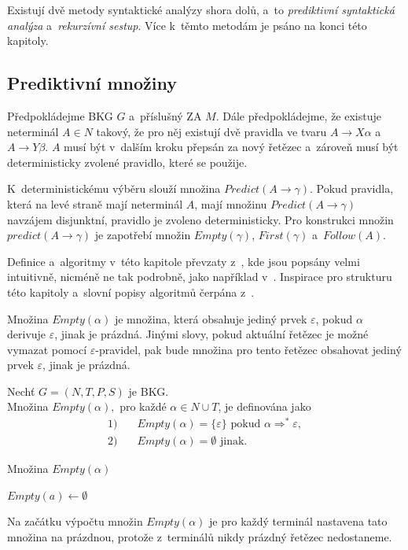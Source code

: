 Existují dvě metody syntaktické analýzy shora dolů, a~to \emph{prediktivní syntaktická analýza} a~\emph{rekurzívní sestup}.
Více k~těmto metodám je psáno na konci této kapitoly.

\subsection*{Prediktivní množiny}
Předpokládejme BKG $G$ a~příslušný ZA $M$.
Dále předpokládejme, že existuje neterminál $A \in N$ takový, že pro něj existují dvě pravidla ve tvaru $A \rightarrow X\alpha$ a~$A \rightarrow Y\beta$.
$A$ musí být v~dalším kroku přepsán za nový řetězec a~zároveň musí být deterministicky zvolené pravidlo, které se použije.

K~deterministickému výběru slouží množina $Predict(A \rightarrow \gamma)$.
Pokud pravidla, která na levé straně mají neterminál $A$, mají množinu $Predict(A \rightarrow \gamma)$ navzájem disjunktní, pravidlo je zvoleno deterministicky.
Pro konstrukci množin $predict(A \rightarrow \gamma)$ je zapotřebí množin $Empty(\gamma)$, $First(\gamma)$ a~$Follow(A)$. 

Definice a~algoritmy v~této kapitole převzaty z~\cite{meduna2017sa-shora-dolu,kunda2022}, kde jsou popsány velmi intuitivně, nicméně ne tak podrobně, jako například v~\cite{medunaElementsOfCompDesign}.
Inspirace pro strukturu této kapitoly a~slovní popisy algoritmů čerpána z~\cite{kunda2022}.

Množina $Empty(\alpha)$ je množina, která obsahuje jediný prvek $\varepsilon$, pokud $\alpha$ derivuje $\varepsilon$, jinak je prázdná.
Jinými slovy, pokud aktuální řetězec je možné vymazat pomocí $\varepsilon$-pravidel, pak bude množina pro tento řetězec obsahovat jediný prvek $\varepsilon$, jinak je prázdná.
\begin{definition}\label{def_mnozina_empty}
    Nechť $G = (N, T, P, S)$ je BKG. \\
    Množina $Empty(\alpha),$ pro každé $\alpha \in N \cup T$, je definována jako
    \begin{align*}
        1) & \quad Empty(\alpha) = \{\varepsilon\} \text{ pokud } \alpha \Rightarrow^* \varepsilon, \\
        2) & \quad Empty(\alpha) = \emptyset \text{ jinak}.
    \end{align*}
\end{definition}

\begin{algorithm}[ht]
    \caption{Množina $Empty(\alpha)$}
    \label{alg_mnozina_empty}
    \begin{algorithmic}[1]
        \NewLine
            \State $Empty(a) \gets \emptyset$
        \EndFor
    \end{algorithmic}
\end{algorithm}
\addtocounter{algorithm}{-1}
Na začátku výpočtu množin $Empty(\alpha)$ je pro každý terminál nastavena tato množina na prázdnou, protože z~terminálů nikdy prázdný řetězec nedostaneme.

